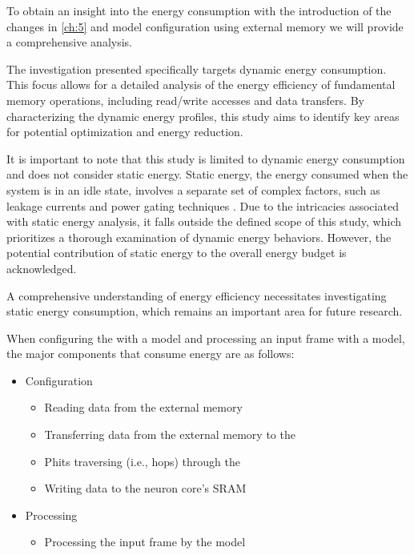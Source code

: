 To obtain an insight into the energy consumption with the introduction of the \confignoc{} changes in \cref{ch:5} and model configuration using external memory we will provide a comprehensive analysis.

The investigation presented specifically targets dynamic energy consumption.
This focus allows for a detailed analysis of the energy efficiency of fundamental memory operations, including read/write accesses and data transfers.
By characterizing the dynamic energy profiles, this study aims to identify key areas for potential optimization and energy reduction.

It is important to note that this study is limited to dynamic energy consumption and does not consider static energy.
Static energy, the energy consumed when the system is in an idle state, involves a separate set of complex factors, such as leakage currents and power gating techniques \cite{haj-yahyaStaticPowerModeling2018}.
Due to the intricacies associated with static energy analysis, it falls outside the defined scope of this study, which prioritizes a thorough examination of dynamic energy behaviors.
However, the potential contribution of static energy to the overall energy budget is acknowledged.

A comprehensive understanding of energy efficiency necessitates investigating static energy consumption, which remains an important area for future research.

When configuring the \graicore{} with a model and processing an input frame with a model, the major components that consume energy are as follows:
\begin{itemize}
    \item Configuration
    \begin{itemize}
        \item Reading data from the external memory
        \item Transferring data from the external memory to the \confignoc{}
        \item Phits traversing (i.e., hops) through the \confignoc{}
        \item Writing data to the neuron core's SRAM
    \end{itemize}
    \item Processing
    \begin{itemize}
        \item Processing the input frame by the model
    \end{itemize}
\end{itemize}
